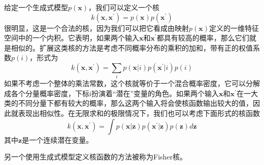 给定一个生成式模型$p(\boldsymbol{x})$，我们可以定义一个核
\begin{equation}
	k(\boldsymbol{x},\boldsymbol{x}^{'})=p(\boldsymbol{x})p(\boldsymbol{x}^{'})
\end{equation}
很明显，这是一个合法的核，因为我们可以把它看成由映射$p(\boldsymbol{x})$定义的一维特征空间中的一个内积。它表明，如果两个输入$\boldsymbol{x}$和$\boldsymbol{x}^{'}$都具有较高的概率，那么它们就是相似的。扩展这类核的方法是考虑不同概率分布的乘积的加和，带有正的权值系数$p(i)$，形式为
\begin{equation}
	k(\boldsymbol{x},\boldsymbol{x}^{'})=\sum_ip(\boldsymbol{x}|i)p(\boldsymbol{x}^{'}|i)p(i)
\end{equation}
如果不考虑一个整体的乘法常数，这个核就等价于一个混合概率密度，它可以分解成各个分量概率密度，下标i扮演着“潜在”变量的角色。如果两个输入$\boldsymbol{x}$和$\boldsymbol{x}^{'}$在一大类的不同分量下都有较大的概率，那么这两个输入将会使核函数输出较大的值，因此就表现出相似性。在无限求和的极限情况下，我们也可以考虑下面形式的核函数 
\begin{equation}
		k(\boldsymbol{x},\boldsymbol{x}^{'})=\int p(\boldsymbol{x}|\boldsymbol{z})p(\boldsymbol{x}^{'}|\boldsymbol{z})p(\boldsymbol{z})d\boldsymbol{z}
\end{equation}
其中$\boldsymbol{z}$是一个连续潜在变量。

另一个使用生成式模型定义核函数的方法被称为Fisher核。